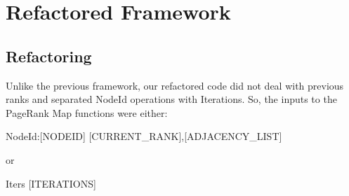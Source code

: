 \section{Refactored Framework}
\subsection*{Refactoring}
Unlike the previous framework, our refactored code did not deal with previous ranks and separated NodeId operations with Iterations. So, the inputs to the PageRank Map functions were either:
\begin{center}
  NodeId:[NODEID] \hspace{8mm} [CURRENT\_RANK],[ADJACENCY\_LIST]
\end{center}
or
\begin{center}
  Iters \hspace{8mm} [ITERATIONS]
\end{center}


